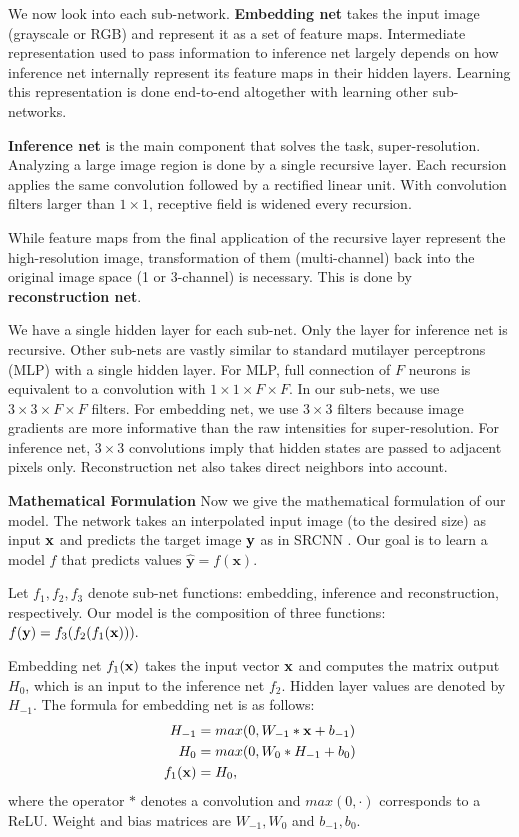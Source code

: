 \documentclass[10pt,twocolumn,letterpaper]{article}
\begin{document}
We now look into each sub-network. \textbf{Embedding net} takes the input image (grayscale or RGB) and represent it as a set of feature maps. Intermediate representation used to pass information to inference net largely depends on how inference net internally represent its feature maps in their hidden layers. Learning this representation is done end-to-end altogether with learning other sub-networks.


\textbf{Inference net} is the main component that solves the task, super-resolution. Analyzing a large image region is done by a single recursive layer. Each recursion applies the same convolution followed by a rectified linear unit. With convolution filters larger than $1\times 1$, receptive field is widened every recursion.   

While feature maps from the final application of the recursive layer represent the high-resolution image, transformation of them (multi-channel) back into the original image space (1 or 3-channel) is necessary. This is done by \textbf{reconstruction net}.  

We have a single hidden layer for each sub-net. Only the layer for inference net is recursive. Other sub-nets are vastly similar to standard mutilayer perceptrons (MLP) with a single hidden layer. For MLP, full connection of $F$ neurons is equivalent to a convolution with $1\times 1\times F \times F$. In our sub-nets, we use $3\times 3\times F \times F$ filters. For embedding net, we use $3\times 3$ filters because image gradients are more informative than the raw intensities for super-resolution. For inference net, $3\times 3$ convolutions imply that hidden states are passed to adjacent pixels only. Reconstruction net also takes direct neighbors into account.

\textbf{Mathematical Formulation} Now we give the mathematical formulation of our model. The network takes an interpolated input image (to the desired size) as input ${\bf x}$ and predicts the target image ${\bf y}$ as in SRCNN \cite{dong2014image}. Our goal is to learn a model $f$ that predicts values $\mathbf{\hat{y}}=f(\mathbf{x})$.  

 Let $f_1, f_2, f_3$ denote sub-net functions: embedding, inference and reconstruction, respectively. Our model is the composition of three functions: $f({\bf y}) = f_3(f_2 (f_1({\bf x}))).$
 
 Embedding net $f_1({\bf x})$ takes the input vector ${\bf x}$ and computes the matrix output $H_0$, which is an input to the inference net $f_2$. Hidden layer values are denoted by $H_{-1}$. The formula for embedding net is as follows:
  \begin{align}
        H_{-1} &= max(0, W_{-1}*{\bf x} + b_{-1})\\
        H_0 &= max(0, W_{0}*H_{-1} + b_0)\\
        f_1({\bf x}) &= H_0,
    \end{align}
where the operator $*$ denotes a convolution and $max(0,\cdot)$ corresponds to a ReLU. Weight and bias matrices are $W_{-1},W_0$ and $b_{-1},b_0$.
\end{document}
